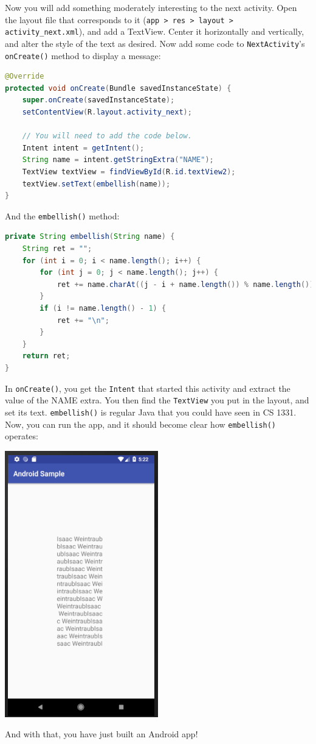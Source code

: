\documentclass{article}
\begin{document}
Now you will add something moderately interesting to the next activity. Open the layout file that corresponds to it (\texttt{app > res > layout > activity\_next.xml}), and add a TextView. Center it horizontally and vertically, and alter the style of the text as desired. Now add some code to \texttt{NextActivity}'s \texttt{onCreate()} method to display a message:
\begin{lstlisting}[language=Java]
@Override
protected void onCreate(Bundle savedInstanceState) {
    super.onCreate(savedInstanceState);
    setContentView(R.layout.activity_next);
    
    // You will need to add the code below.
    Intent intent = getIntent();
    String name = intent.getStringExtra("NAME");
    TextView textView = findViewById(R.id.textView2);
    textView.setText(embellish(name));
}
\end{lstlisting}
And the \texttt{embellish()} method:
\begin{lstlisting}[language=Java]
private String embellish(String name) {
    String ret = "";
    for (int i = 0; i < name.length(); i++) {
        for (int j = 0; j < name.length(); j++) {
            ret += name.charAt((j - i + name.length()) % name.length());
        }
        if (i != name.length() - 1) {
            ret += "\n";
        }
    }
    return ret;
}
\end{lstlisting}
In \texttt{onCreate()}, you get the \texttt{Intent} that started this activity and extract the value of the NAME extra. You then find the \texttt{TextView} you put in the layout, and set its text. \texttt{embellish()} is regular Java that you could have seen in CS 1331. Now, you can run the app, and it should become clear how \texttt{embellish()} operates: 
\begin{center}\includegraphics[width=.4\textwidth]{images/finished.png}\end{center}
And with that, you have just built an Android app!
\end{document}
